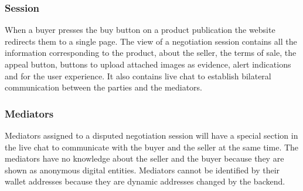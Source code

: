 \documentclass[12pt]{article}
\begin{document}
\subsubsection { Session } 

When a buyer presses the buy button on a product publication the website redirects them to a single page. The view of a negotiation session contains all the information corresponding to the product, about the seller, the terms of sale, the appeal button, buttons to upload attached images as evidence, alert indications and for the user experience. It also contains live chat to establish bilateral communication between the parties and the mediators.

\subsubsection { Mediators } 

Mediators assigned to a disputed negotiation session will have a special section in the live chat to communicate with the buyer and the seller at the same time. The mediators have no knowledge about the seller and the buyer because they are shown as anonymous digital entities. Mediators cannot be identified by their wallet addresses because they are dynamic addresses changed by the backend.
\end{document}
